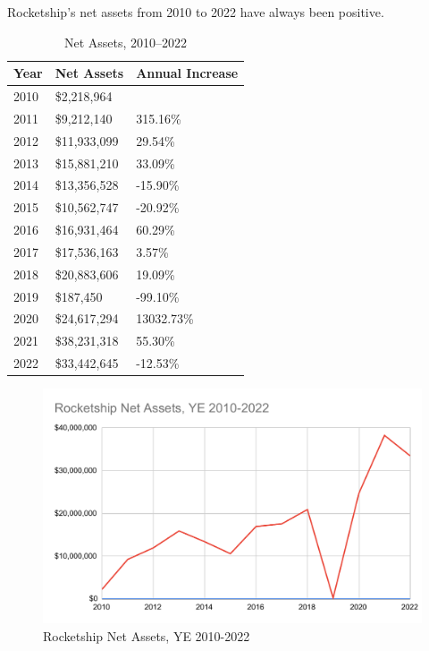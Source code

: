 Rocketship's net assets from 2010 to 2022 have always been positive.
\begin{table}[ht]\caption{Net Assets, 2010–2022}\label{tab:net_assets}
  \begin{tabular}{lll}
    \toprule
    \textbf{Year} & \textbf{Net Assets} & \textbf{Annual Increase}\\
    \midrule
    2010 &   \$2,218,964	&            \\
    2011 &   \$9,212,140	&   315.16\% \\
    2012 &  \$11,933,099	&    29.54\% \\
    2013 &  \$15,881,210	&    33.09\% \\ 
    2014 &  \$13,356,528	&   -15.90\% \\
    2015 &  \$10,562,747	&   -20.92\% \\
    2016 &  \$16,931,464	&    60.29\% \\
    2017 &  \$17,536,163	&     3.57\% \\
    2018 &  \$20,883,606	&    19.09\% \\
    2019 &     \$187,450        &   -99.10\% \\
    2020 &  \$24,617,294        & 13032.73\% \\
    2021 &  \$38,231,318	&    55.30\% \\ 
    2022 &  \$33,442,645        &   -12.53\% \\
    \bottomrule
  \end{tabular}
\end{table}


\begin{figure}[t]
  \centering
  \includegraphics[width=\textwidth,keepaspectratio]{Net_Assets}%
  \caption{Rocketship Net Assets, YE 2010-2022}%
  \label{fig:net_assets}
\end{figure}

